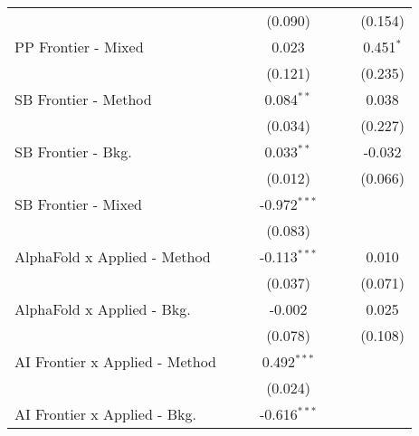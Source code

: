 \begin{tabular}{lcccccc}
                                  &                &               & (0.090)        &               &              & (0.154)\\   
   PP Frontier - Mixed            &                &               & 0.023          &               &              & 0.451$^{*}$\\   
                                  &                &               & (0.121)        &               &              & (0.235)\\   
   SB Frontier - Method           &                &               & 0.084$^{**}$   &               &              & 0.038\\   
                                  &                &               & (0.034)        &               &              & (0.227)\\   
   SB Frontier - Bkg.             &                &               & 0.033$^{**}$   &               &              & -0.032\\   
                                  &                &               & (0.012)        &               &              & (0.066)\\   
   SB Frontier - Mixed            &                &               & -0.972$^{***}$ &               &              &   \\   
                                  &                &               & (0.083)        &               &              &   \\   
   AlphaFold x Applied - Method   &                &               & -0.113$^{***}$ &               &              & 0.010\\   
                                  &                &               & (0.037)        &               &              & (0.071)\\   
   AlphaFold x Applied - Bkg.     &                &               & -0.002         &               &              & 0.025\\   
                                  &                &               & (0.078)        &               &              & (0.108)\\   
   AI Frontier x Applied - Method &                &               & 0.492$^{***}$  &               &              &   \\   
                                  &                &               & (0.024)        &               &              &   \\   
   AI Frontier x Applied - Bkg.   &                &               & -0.616$^{***}$ &               &              &   \\   

\end{tabular}
